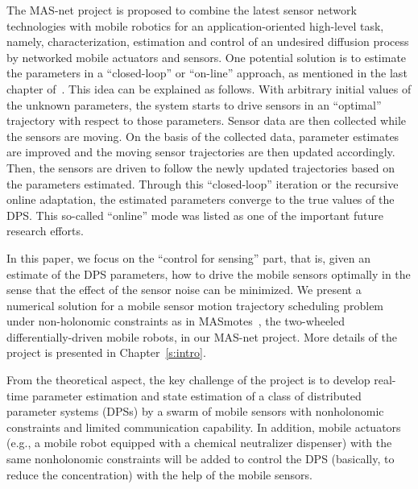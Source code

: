 The MAS-net project is proposed to combine the latest sensor network technologies with mobile robotics for an application-oriented high-level task, namely, characterization, estimation and control of an undesired diffusion process by networked mobile actuators and sensors. One potential solution is to estimate the parameters in a ``closed-loop'' or ``on-line'' approach, as mentioned in the last chapter of~\cite{Patan2004}. This idea can be explained as follows. With arbitrary initial values of the unknown parameters, the system starts to drive sensors in an ``optimal'' trajectory with respect to those parameters. Sensor data are then collected while the sensors are moving.
    On the basis of the collected data, parameter estimates are improved and the moving sensor trajectories are then updated accordingly. Then, the sensors are driven to follow the newly updated trajectories based on the parameters estimated. Through this ``closed-loop'' iteration or the recursive online adaptation, the estimated parameters converge to the true values of the DPS. This so-called ``online'' mode was listed as one of the important future research efforts.




In this paper, we focus on the ``control for sensing'' part, that is, given an estimate of the DPS parameters, how to drive the mobile sensors optimally in the sense that the effect of the sensor noise can be minimized. We present a numerical solution for a mobile sensor motion trajectory scheduling problem under non-holonomic constraints as in MASmotes~\cite{ZhongminRobio04}, the two-wheeled differentially-driven mobile robots, in our MAS-net project.
More details of the project is presented in Chapter~\ref{s:intro}.

    From the theoretical aspect, the key challenge of the project is to develop real-time parameter estimation and state estimation of a class of distributed parameter systems (DPSs) by a swarm of mobile sensors with nonholonomic constraints and limited communication capability. In addition, mobile actuators  (e.g., a mobile robot equipped with a chemical neutralizer dispenser) with the same nonholonomic constraints will be added to control the DPS (basically, to reduce the concentration) with the help of the mobile sensors.


